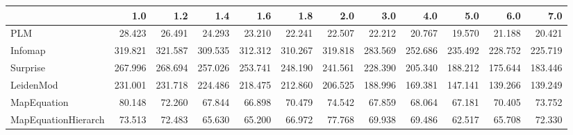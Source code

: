 \begin{tabular}{lrrrrrrrrrrr}
\toprule
{} &     1.0 &     1.2 &     1.4 &     1.6 &     1.8 &     2.0 &     3.0 &     4.0 &     5.0 &     6.0 &     7.0 \\
\midrule
PLM                 &  28.423 &  26.491 &  24.293 &  23.210 &  22.241 &  22.507 &  22.212 &  20.767 &  19.570 &  21.188 &  20.421 \\
Infomap             & 319.821 & 321.587 & 309.535 & 312.312 & 310.267 & 319.818 & 283.569 & 252.686 & 235.492 & 228.752 & 225.719 \\
Surprise            & 267.996 & 268.694 & 257.026 & 253.741 & 248.190 & 241.561 & 228.390 & 205.340 & 188.212 & 175.644 & 183.446 \\
LeidenMod           & 231.001 & 231.718 & 224.486 & 218.475 & 212.860 & 206.525 & 188.996 & 169.381 & 147.141 & 139.266 & 139.249 \\
MapEquation         &  80.148 &  72.260 &  67.844 &  66.898 &  70.479 &  74.542 &  67.859 &  68.064 &  67.181 &  70.405 &  73.752 \\
MapEquationHierarch &  73.513 &  72.483 &  65.630 &  65.200 &  66.972 &  77.768 &  69.938 &  69.486 &  62.517 &  65.708 &  72.330 \\
\bottomrule
\end{tabular}

